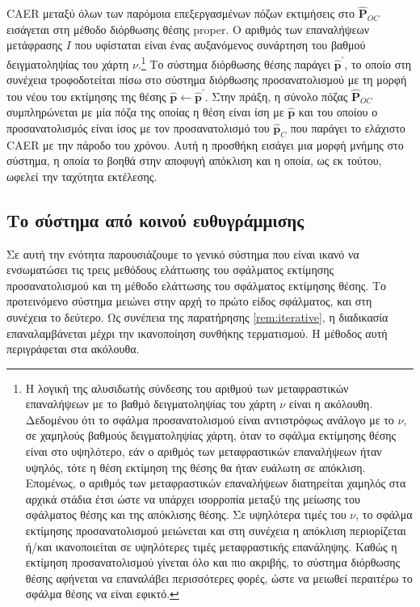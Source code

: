 CAER μεταξύ όλων των παρόμοια επεξεργασμένων πόζων εκτιμήσεις στο
$\hat{\bm{P}}_{OC}$ εισάγεται στη μέθοδο διόρθωσης θέσης proper. Ο αριθμός των
επαναλήψεων μετάφρασης $I$ που υφίσταται είναι ένας αυξανόμενος συνάρτηση του
βαθμού δειγματοληψίας του χάρτη $\nu$.\footnote{Η λογική της αλυσιδωτής
σύνδεσης του αριθμού των μεταφραστικών επαναλήψεων με το βαθμό δειγματοληψίας
του χάρτη $\nu$ είναι η ακόλουθη.  Δεδομένου ότι το σφάλμα προσανατολισμού
είναι αντιστρόφως ανάλογο με το $\nu$, σε χαμηλούς βαθμούς δειγματοληψίας
χάρτη, όταν το σφάλμα εκτίμησης θέσης είναι στο υψηλότερο, εάν ο αριθμός των
μεταφραστικών επαναλήψεων ήταν υψηλός, τότε η θέση εκτίμηση της θέσης θα ήταν
ευάλωτη σε απόκλιση. Επομένως, ο αριθμός των μεταφραστικών επαναλήψεων
διατηρείται χαμηλός στα αρχικά στάδια έτσι ώστε να υπάρχει ισορροπία μεταξύ της
μείωσης του σφάλματος θέσης και της απόκλισης θέσης. Σε υψηλότερα τιμές του
$\nu$, το σφάλμα εκτίμησης προσανατολισμού μειώνεται και στη συνέχεια η
απόκλιση περιορίζεται ή/και ικανοποιείται σε υψηλότερες τιμές μεταφραστικής
επανάληψης.  Καθώς η εκτίμηση προσανατολισμού γίνεται όλο και πιο ακριβής, το
σύστημα διόρθωσης θέσης αφήνεται να επαναλάβει περισσότερες φορές, ώστε να
μειωθεί περαιτέρω το σφάλμα θέσης να είναι εφικτό.} Το σύστημα διόρθωσης θέσης
παράγει $\hat{\bm{p}}^\prime$, το οποίο στη συνέχεια τροφοδοτείται πίσω στο
σύστημα διόρθωσης προσανατολισμού με τη μορφή του νέου του εκτίμησης της θέσης
$\hat{\bm{p}} \leftarrow \hat{\bm{p}}^\prime$. Στην πράξη, η σύνολο πόζας
$\hat{\bm{P}}_{OC}$ συμπληρώνεται με μία πόζα της οποίας η θέση είναι ίση με
$\hat{\bm{p}}$ και του οποίου ο προσανατολισμός είναι ίσος με τον
προσανατολισμό του $\hat{\bm{p}}_C$ που παράγει το ελάχιστο CAER με την πάροδο
του χρόνου. Αυτή η προσθήκη εισάγει μια μορφή μνήμης στο σύστημα, η οποία το
βοηθά στην αποφυγή απόκλιση και η οποία, ως εκ τούτου, ωφελεί την ταχύτητα
εκτέλεσης.




\subsection{Το σύστημα από κοινού ευθυγράμμισης}
\label{subsection:02_04_04:02}

Σε αυτή την ενότητα παρουσιάζουμε το γενικό σύστημα που είναι ικανό να
ενσωματώσει τις τρεις μεθόδους ελάττωσης του σφάλματος εκτίμησης
προσανατολισμού και τη μέθοδο ελάττωσης του σφάλματος εκτίμησης θέσης.  Το
προτεινόμενο σύστημα μειώνει στην αρχή το πρώτο είδος σφάλματος, και στη
συνέχεια το δεύτερο. Ως συνέπεια της παρατήρησης \ref{rem:iterative}, η
διαδικασία επαναλαμβάνεται μέχρι την ικανοποίηση συνθήκης τερματισμού. Η
μέθοδος αυτή περιγράφεται στα ακόλουθα.


